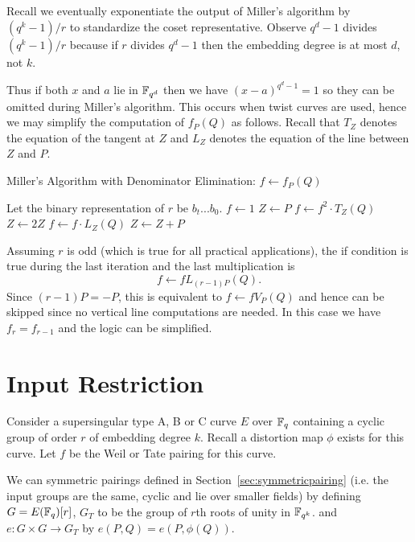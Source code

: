 Recall we eventually exponentiate the output of Miller's algorithm by
$(q^k - 1)/r$ to standardize the coset representative. Observe
$q^d - 1$ divides $(q^k-1)/r$ because if $r$ divides $q^d - 1$ then
the embedding degree is at most $d$, not $k$.

Thus if both $x$ and $a$ lie in $\mathbb{F}_{q^d}$ then we have
$(x-a)^{q^d - 1} = 1$ so they can be omitted during Miller's algorithm.
This occurs when twist curves are used, hence we may simplify
the computation of $f_P(Q)$ as follows. Recall that $T_Z$ denotes the
equation of the tangent at $Z$ and $L_Z$ denotes the equation of
the line between $Z$ and $P$.

\begin{algorithm}
\caption {Miller's Algorithm with Denominator Elimination: $f \gets f_P(Q)$}
\begin{algorithmic}[1]
\STATE Let the binary representation of $r$ be $b_t ... b_0$.
\STATE $f \gets 1$
\STATE $Z \gets P$
    \STATE $f \gets f^2 \cdot T_Z(Q)$
    \STATE $Z \gets 2Z$
	\STATE $f \gets f \cdot L_Z(Q)$
	\STATE $Z \gets Z + P$
    \ENDIF
\ENDFOR
\end{algorithmic}
\end{algorithm}

Assuming $r$ is odd (which is true for all practical applications),
the if condition is true during the last iteration and
the last multiplication is
\[ f \leftarrow f L_{(r-1)P}(Q) .\]
Since $(r-1)P = -P$, this is equivalent to $f \leftarrow f V_P(Q)$
and hence can be skipped since no vertical line computations are needed.
In this case we have $f_r = f_{r-1}$ and the logic can be simplified.

\section {\label{sec:inputrestriction}Input Restriction}

Consider a supersingular type A, B or C curve $E$ over $\mathbb{F}_q$ containing
a cyclic group of order $r$ of embedding degree $k$. Recall
a distortion map $\phi$ exists for this curve.
Let $f$ be the Weil or Tate pairing for this
curve.

We can symmetric pairings defined in Section~\ref{sec:symmetricpairing}
(i.e. the input groups are the same, cyclic and lie over smaller fields)
by defining $G = E(\mathbb{F}_q)[r]$,
$G_T$ to be the group of $r$th roots of unity in $\mathbb{F}_{q^k}$.
and $e : G \times G \rightarrow G_T$ by
$e(P,Q) = e(P, \phi(Q))$.

